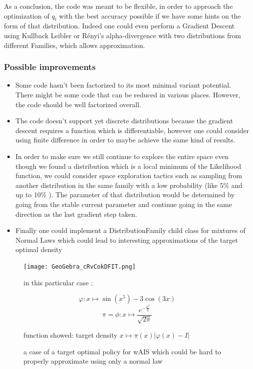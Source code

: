 As a conclusion, the code was meant to be flexible, in order to approach the optimization of $q_t$ with the best accuracy possible if we have some hints on the form of that distribution. Indeed one could even perform a Gradient Descent using Kullback Leibler or Rényi's alpha-divergence with two distributions from different Families, which allows approximation.

\subsubsection{Possible improvements}

\begin{itemize}

\item Some code hasn't been factorized to its most minimal variant potential. There might be some code that can be reduced in various places. However, the code should be well factorized overall.

\item The code doesn't support yet discrete distributions because the gradient descent requires a function which is differentiable, however one could consider using finite difference in order to maybe achieve the same kind of results.

\item In order to make sure we still continue to explore the entire space even though we found a distribution which is a local minimum of the Likelihood function, we could consider space exploration tactics such as sampling from another distribution in the same family with a low probability (like 5\% and up to 10\% ). The parameter of that distribution would be determined by going from the stable current parameter and continue going in the same direction as the last gradient step taken.

\item Finally one could implement a DistributionFamily child class for mixtures of Normal Laws which could lead to interesting approximations of the target optimal density
\end{itemize}

\begin{figure}[H]
    \centering
    \texttt{[image: GeoGebra\_cRvCokDFIT.png]}
    \caption{a case of a target optimal policy for wAIS which could be hard to properly approximate using only a normal law}

    in this particular case :

    $$\varphi : x \mapsto \sin(x^5) - 3 \cos(3x)$$
    $$\pi = \phi : x \mapsto \frac{e^{- \frac {x^2}{2}}}{\sqrt{2 \pi}}$$

    function showed: target density $x \mapsto \pi(x) \left\vert \varphi(x) - I \right\vert$
    
    \label{fig:complexdistrib}
\end{figure}